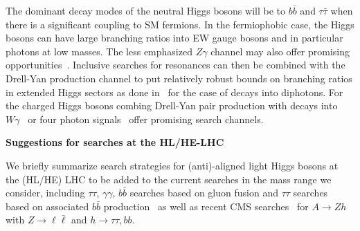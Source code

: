 \documentclass[../report.tex]{subfiles}
\begin{document}
The dominant decay modes of the neutral Higgs bosons will be to $b\bar{b}$ and $\tau\bar{\tau}$ when there is a significant coupling to SM fermions. In the fermiophobic case, the Higgs bosons can have large branching ratios into EW gauge bosons and in particular photons at low masses. The less emphasized $Z\gamma$ channel may also offer promising opportunities~\cite{Degrande:2017naf}. Inclusive searches for resonances can then be combined with the Drell-Yan production channel to put relatively robust bounds on branching ratios in extended Higgs sectors as done in~\cite{Delgado:2016arn,Vega:2018ddp} for the case of decays into diphotons. For the charged Higgs bosons combing Drell-Yan pair production with decays into $W\gamma$~\cite{Ilisie:2014hea,Degrande:2017naf} or four photon signals~\cite{Aaltonen:2016fnw} offer promising search channels.


{\bf{Suggestions for searches at the HL/HE-LHC}}

We briefly summarize search strategies for (anti)-aligned light
Higgs bosons at the (HL/HE) LHC to be added to the current searches in the mass range we consider, including
$\tau\tau,\,\gamma\gamma,\,b\bar{b}$ searches based on gluon fusion and
$\tau\tau$ searches based on associated $b\bar{b}$
production~\cite{Aad:2014vgg,Khachatryan:2014wca,Khachatryan:2015baw} as
well as recent CMS searches~\cite{CMS:2015mba} for $A \to Zh$ with $Z
\to \ell\bar\ell$ and $h\to \tau\tau, bb$.  

\end{document}
